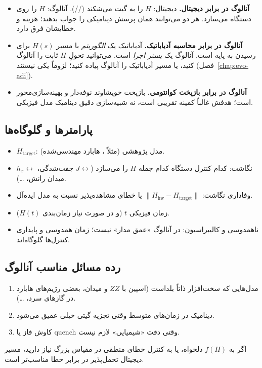 \begin{itemize}
	\item \textbf{آنالوگ در برابر دیجیتال.} دیجیتال: $H$ را به گیت می‌شکند (//). آنالوگ: $H$ را روی دستگاه می‌سازد. هر دو می‌توانند همان پرسش دینامیکی را جواب بدهند؛ هزینه و خطایشان فرق دارد.
	\item \textbf{آنالوگ در برابر محاسبه آدیاباتیک.} آدیاباتیک یک \emph{الگوریتم} با مسیر $H(s)$ برای رسیدن به پایه است. آنالوگ یک \emph{بستر اجرا} است. می‌توانید تحولِ $H$ ثابت را آنالوگ کنید، یا مسیر آدیاباتیک را آنالوگ پیاده کنید؛ لزوماً یکی نیستند (فصل~\ref{chap:evo-adi}).
	\item \textbf{آنالوگ در برابر بازپخت کوانتومی.} بازپخت خویشاوند نوفه‌دار و بهینه‌سازی‌محور است؛ هدفش غالباً کمینه تقریبی است، نه شبیه‌سازی دقیق دینامیک مدل فیزیکی.
\end{itemize}

\subsection{پارامترها و گلوگاه‌ها}

\begin{itemize}
	\item $H_{\mathrm{target}}$: مدل پژوهشی (مثلاً ، هابارد مهندسی‌شده).
	\item نگاشت: کدام کنترل دستگاه کدام جمله $H$ را می‌سازد ($J\leftrightarrow$ جفت‌شدگی، $h_x\leftrightarrow$ میدان رانش، \ldots).
	\item وفاداری نگاشت: $\lVert H_{\mathrm{hw}}-H_{\mathrm{target}}\rVert$ یا خطای مشاهده‌پذیر نسبت به مدل ایده‌آل.
	\item زمان فیزیکی $t$ (و در صورت نیاز زمان‌بندی $H(t)$).
	\item ناهمدوسی و کالیبراسیون: در آنالوگ «عمق مدار» نیست؛ زمان همدوسی و پایداری کنترل‌ها گلوگاه‌اند.
\end{itemize}

\subsection{رده مسائل مناسب آنالوگ}

\begin{enumerate}
	\item مدل‌هایی که سخت‌افزار ذاتاً بلداست (اسپین با $ZZ$ و میدان، بعضی رژیم‌های هابارد در گازهای سرد، \ldots).
	\item دینامیک در زمان‌های متوسط وقتی تجزیه گیتی خیلی عمیق می‌شود.
	\item کاوش فاز یا quench وقتی دقت «شیمیایی»  لازم نیست.
\end{enumerate}
اگر به $f(H)$ دلخواه، یا به کنترل خطای منطقی در مقیاس بزرگ نیاز دارید، مسیر دیجیتال تحمل‌پذیر در برابر خطا مناسب‌تر است.


